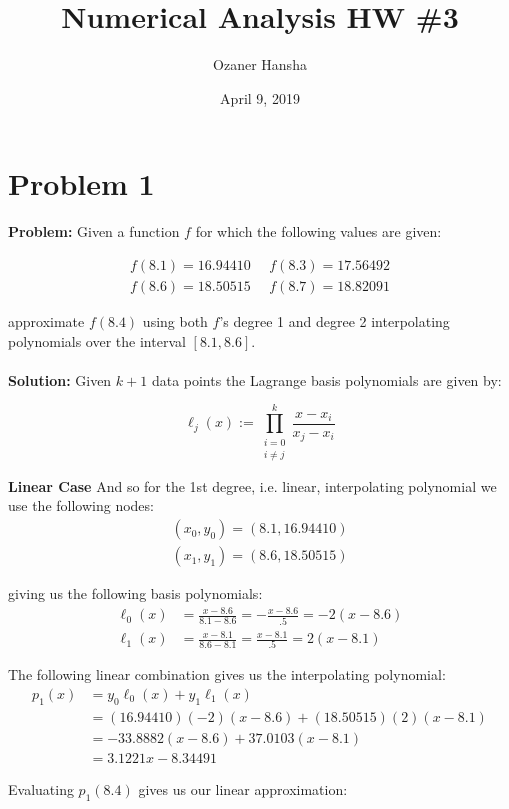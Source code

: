 \documentclass{article}
\begin{document}
\title{Numerical Analysis HW \#3}
\author{Ozaner Hansha}
\date{April 9, 2019}
\maketitle

\section*{Problem 1}
\textbf{Problem:} Given a function $f$ for which the following values are given:

\begin{gather*}
  f(8.1) = 16.94410\ \ \ \ \ \ f(8.3) = 17.56492\\
  f(8.6) = 18.50515\ \ \ \ \ \ f(8.7) = 18.82091
\end{gather*}

approximate $f(8.4)$ using both $f$'s degree 1 and degree 2 interpolating polynomials over the interval $[8.1,8.6]$.
\\\\
\textbf{Solution:} Given $k+1$ data points the Lagrange basis polynomials are given by:

$$\ell_{j}(x):=\prod_{\substack{i=0\\i\neq j}}^k\frac {x-x_i}{x_j-x_i}$$

\textbf{Linear Case}
And so for the 1st degree, i.e. linear, interpolating polynomial we use the following nodes:
\begin{gather*}
  (x_0,y_0)=(8.1,16.94410)\\
  (x_1,y_1)=(8.6,18.50515)
\end{gather*}

giving us the following basis polynomials:
\begin{align*}
  \ell_0(x)&=\frac{x-8.6}{8.1-8.6}=-\frac{x-8.6}{.5}=-2(x-8.6)\\
  \ell_1(x)&=\frac{x-8.1}{8.6-8.1}=\frac{x-8.1}{.5}=2(x-8.1)
\end{align*}

The following linear combination gives us the interpolating polynomial:
\begin{align*}
  p_1(x)&=y_0\ell_0(x)+y_1\ell_1(x)\\
  &=(16.94410)(-2)(x-8.6)+(18.50515)(2)(x-8.1)\\
  &=-33.8882(x-8.6)+37.0103(x-8.1)\\
  &=3.1221x - 8.34491
\end{align*}

Evaluating $p_1(8.4)$ gives us our linear approximation:
\end{document}
